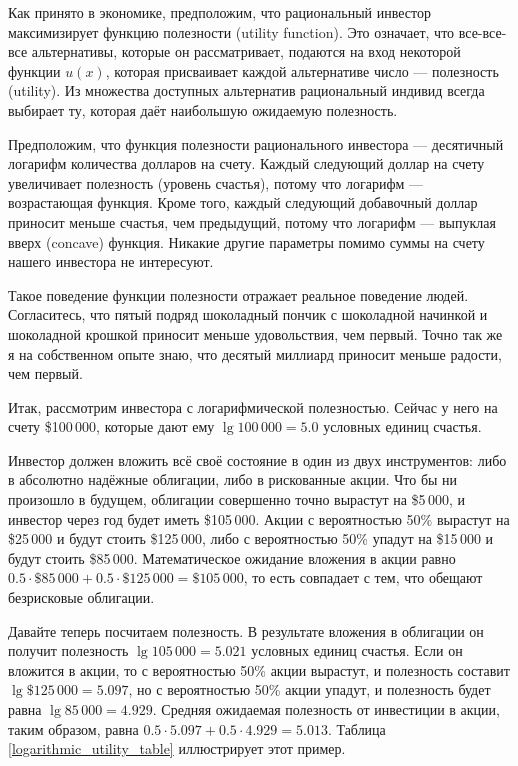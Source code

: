  Как принято в экономике, предположим, что рациональный инвестор максимизирует функцию
 полезности (utility function). Это означает, что все-все-все альтернативы, которые он рассматривает,
 подаются на вход некоторой функции $u(x)$, которая присваивает каждой альтернативе число --- полезность (utility).
 Из множества доступных альтернатив рациональный индивид всегда выбирает ту, которая даёт наибольшую ожидаемую полезность.
 
 Предположим, что функция полезности рационального инвестора --- десятичный логарифм количества долларов
 на счету. Каждый следующий доллар на счету увеличивает полезность (уровень счастья), потому что логарифм
 --- возрастающая функция. Кроме того, каждый следующий добавочный доллар приносит меньше счастья, чем предыдущий, потому что логарифм --- выпуклая вверх (concave) функция. Никакие другие параметры помимо суммы на счету нашего инвестора не интересуют.
 
 Такое поведение функции полезности отражает реальное поведение людей. Согласитесь, что пятый подряд шоколадный пончик с шоколадной начинкой и шоколадной крошкой приносит меньше удовольствия, чем первый. Точно так же я на собственном опыте знаю, что десятый миллиард приносит меньше радости, чем первый.
 
 Итак, рассмотрим инвестора с логарифмической полезностью. Сейчас у него на счету \$100\,000, которые дают ему $\lg 100\,000 = 5.0$ условных единиц счастья.
 
 Инвестор должен вложить всё своё состояние в один из двух инструментов: либо в абсолютно надёжные облигации, либо в рискованные акции. Что бы ни произошло в будущем, облигации совершенно точно вырастут на \$5\,000, и инвестор через год будет иметь \$105\,000. Акции с вероятностью 50\% вырастут на \$25\,000 и будут стоить \$125\,000, либо с вероятностью 50\% упадут на \$15\,000 и будут стоить \$85\,000. Математическое ожидание вложения в акции равно $0.5 \cdot \$85\,000 + 0.5 \cdot \$125\,000 = \$105\,000$, то есть совпадает с тем, что обещают безрисковые облигации.
 
 Давайте теперь посчитаем полезность. В результате вложения в облигации он получит полезность $\lg 105\,000 = 5.021$ условных единиц счастья. Если он вложится в акции, то с вероятностью 50\% акции вырастут, и полезность составит $\lg \$125\,000 = 5.097$, но с вероятностью 50\% акции упадут, и полезность будет равна  $\lg 85\,000 = 4.929$. Средняя ожидаемая полезность от инвестиции в акции, таким образом, равна $0.5 \cdot 5.097 + 0.5 \cdot 4.929 = 5.013$. Таблица \ref{logarithmic_utility_table} иллюстрирует этот пример.
 
